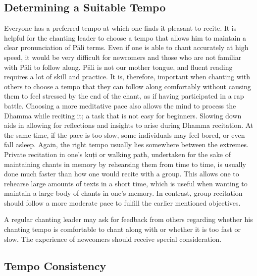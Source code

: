 \subsection*{Determining a Suitable Tempo}

Everyone has a preferred tempo at which one finds it pleasant to recite. It is helpful for the chanting leader to choose a tempo that allows him to maintain a clear pronunciation of Pāli terms. Even if one is able to chant accurately at high speed, it would be very difficult for newcomers and those who are not familiar with Pāli to follow along. Pāli is not our mother tongue, and fluent reading requires a lot of skill and practice. It is, therefore, important when chanting with others to choose a tempo that they can follow along comfortably without causing them to feel stressed by the end of the chant, as if having participated in a rap battle. Choosing a more meditative pace also allows the mind to process the Dhamma while reciting it; a task that is not easy for beginners. Slowing down aids in allowing for reflections and insights to arise during Dhamma recitation. At the same time, if the pace is too slow, some individuals may feel bored, or even fall asleep. Again, the right tempo usually lies somewhere between the extremes. Private recitation in one's kuṭi or walking path, undertaken for the sake of maintaining chants in memory by rehearsing them from time to time, is usually done much faster than how one would recite with a group. This allows one to rehearse large amounts of texts in a short time, which is useful when wanting to maintain a large body of chants in one's memory. \ifbfiveversion\clearpage\fi In contrast, group recitation should follow a more moderate pace to fulfill the earlier mentioned objectives.

A regular chanting leader may ask for feedback from others regarding whether his chanting tempo is comfortable to chant along with or whether it is too fast or slow. The experience of newcomers should receive special consideration.

\ifbfiveversion\vspace{-0.14cm}\fi

\subsection*{Tempo Consistency}

